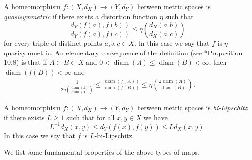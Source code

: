 \documentclass[letterpaper]{amsart}
\theoremstyle{plain}
\theoremstyle{definition}
\theoremstyle{remark}
\numberwithin{equation}{section}
\numberwithin{theorem}{section}
\DeclareMathOperator{\diam}{diam}
\begin{document}
A homeomorphism $f\colon (X,d_X)\to (Y,d_Y)$ between metric spaces is \textit{quasisymmetric} if there exists a distortion function $\eta$ such that
$$ \frac{d_Y(f(a),f(b))}{d_Y(f(a),f(c))} \leq \eta\left(\frac{d_X(a,b)}{d_X(a,c)}\right)$$
for every triple of distinct points $a,b,c\in X$. In this case we say that $f$ is $\eta$-quasisymmetric. An elementary consequence of the definition (see \cite{Heinonen:metric}*{Proposition 10.8}) is that if $A\subset B\subset X$ and $0<\diam (A)\leq \diam (B)<\infty$, then $\diam (f(B))<\infty$ and 
\begin{align}\label{definition:qs}
\frac{1}{2\eta\left( \frac{\diam (B)}{\diam (A)}\right)} \leq \frac{\diam (f(A))}{\diam (f(B))}\leq \eta\left( \frac{2\diam (A)}{\diam (B)}\right).
\end{align}

A homeomorphism $f\colon (X,d_X)\to (Y,d_Y)$ between metric spaces is \textit{bi-Lipschitz} if there exists $L\geq 1$ such that for all $x,y\in X$ we have
$$L^{-1}d_X(x,y)\leq d_Y(f(x),f(y))\leq Ld_X(x,y).$$
In this case we say that $f$ is $L$-bi-Lipschitz. 

We list some fundamental properties of the above types of maps. 
\end{document}
